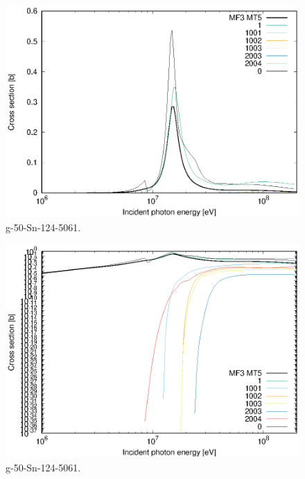 \begin{figure}
 \includegraphics[width=\linewidth]{eps/g_50-Sn-124_5061.eps}
  \caption{g-50-Sn-124-5061.}
\end{figure}
\begin{figure}
 \includegraphics[width=\linewidth]{eps-log/g_50-Sn-124_5061.eps}
 \caption{g-50-Sn-124-5061.}
\end{figure}
\newpage \clearpage

